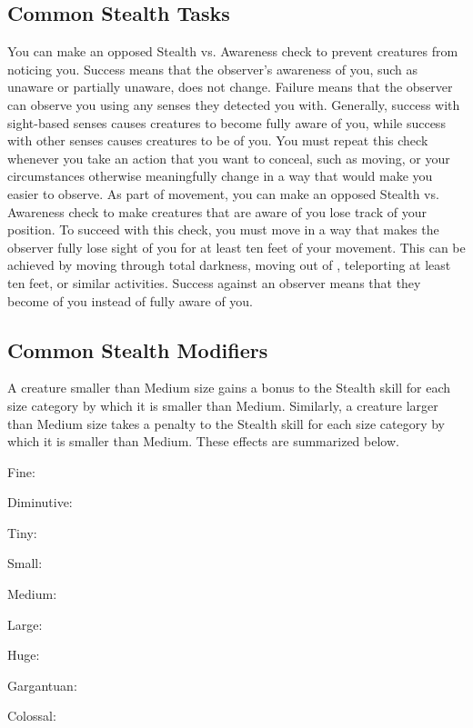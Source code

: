   \subsection{Common Stealth Tasks}
     You can make an opposed Stealth vs. Awareness check to prevent creatures from noticing you.
    Success means that the observer's awareness of you, such as unaware or partially unaware, does not change.
    Failure means that the observer can observe you using any senses they detected you with.
    Generally, success with sight-based senses causes creatures to become fully aware of you, while success with other senses causes creatures to be \partiallyunaware of you.
    You must repeat this check whenever you take an action that you want to conceal, such as moving, or your circumstances otherwise meaningfully change in a way that would make you easier to observe.
     As part of movement, you can make an opposed Stealth vs. Awareness check to make creatures that are aware of you lose track of your position.
    To succeed with this check, you must move in a way that makes the observer fully lose sight of you for at least ten feet of your movement.
    This can be achieved by moving through total darkness, moving out of , teleporting at least ten feet, or similar activities.
    Success against an observer means that they become \partiallyunaware of you instead of fully aware of you.

  \subsection{Common Stealth Modifiers}\label{Common Stealth Modifiers}

    A creature smaller than Medium size gains a  bonus to the Stealth skill for each size category by which it is smaller than Medium.
    Similarly, a creature larger than Medium size takes a  penalty to the Stealth skill for each size category by which it is smaller than Medium.
    These effects are summarized below.
    \begin{raggeditemize}
      \item Fine: 
      \item Diminutive: 
      \item Tiny: 
      \item Small: 
      \item Medium: 
      \item Large: 
      \item Huge: 
      \item Gargantuan: 
      \item Colossal: 
    \end{raggeditemize}

